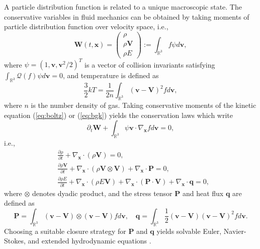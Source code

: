\documentclass[preprint,3p,12pt,sort&compress]{elsarticle}
\begin{document}
A particle distribution function is related to a unique macroscopic state.
The conservative variables in fluid mechanics can be obtained by taking moments of particle distribution function over velocity space, i.e.,
\begin{equation}
    \mathbf{W}(t, \mathbf{x})=\left(\begin{array}{c}
    \rho \\
    \rho \mathbf{V} \\
    \rho E
    \end{array}\right) := \int_{\mathbb R^3} f \psi d \mathbf{v},
\end{equation}
where $\psi=(1,\mathbf v,\mathbf v^2/2)^T$ is a vector of collision invariants satisfying $\int_{\mathbb R^3} \mathcal Q(f) \psi d \mathbf v = 0$, and temperature is defined as
\begin{equation}
    \frac{3}{2} kT = \frac{1}{2n} \int_{\mathbb R^3} (\mathbf v - \mathbf V)^2 f d\mathbf v,
\end{equation}
where $n$ is the number density of gas.
Taking conservative moments of the kinetic equation (\ref{eq:boltz}) or (\ref{eq:bgk}) yields the conservation laws which write
\begin{equation}
    \partial_t \mathbf W + \int_{\mathbb R^3} \psi \mathbf v \cdot \nabla_{\mathbf x} f d\mathbf v=0,
\end{equation}
i.e.,
\begin{equation}
\begin{aligned}
    &\frac{\partial \rho}{\partial t} + \nabla_{\mathbf x} \cdot (\rho \mathbf V)=0, \\
    &\frac{\partial \rho \mathbf V}{\partial t} + \nabla_{\mathbf x} \cdot (\rho \mathbf V \otimes \mathbf V)+\nabla_{\mathbf x} \cdot \mathbf P=0, \\
    &\frac{\partial \rho E}{\partial t} + \nabla_{\mathbf x} \cdot (\rho E\mathbf V)+\nabla_{\mathbf x} \cdot (\mathbf P \cdot \mathbf V)+\nabla_{\mathbf x} \cdot \mathbf q=0,
\end{aligned}
\label{eq:conservation laws}
\end{equation}
where $\otimes$ denotes dyadic product, and the stress tensor $\mathbf P$ and heat flux $\mathbf q$ are defined as
\begin{equation}
    \mathbf P=\int_{\mathbb R^3} (\mathbf v-\mathbf V)\otimes(\mathbf v-\mathbf V)fd\mathbf v, \quad \mathbf q=\int_{\mathbb R^3} \frac{1}{2}(\mathbf v-\mathbf V)(\mathbf v-\mathbf V)^2fd\mathbf v.
\end{equation}
Choosing a suitable closure strategy for $\mathbf P$ and $\mathbf q$ yields solvable Euler, Navier-Stokes, and extended hydrodynamic equations \cite{torrilhon2016modeling}.
\end{document}
